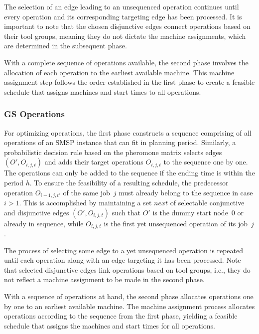 \documentclass[runningheads]{llncs}
\begin{document}
The selection of an edge leading to an unsequenced operation continues until every operation and its corresponding targeting edge has been processed. It is important to note that the chosen disjunctive edges connect operations based on their tool groups, meaning they do not dictate the machine assignments, which are determined in the subsequent phase.

With a complete sequence of operations available, the second phase involves the allocation of each operation to the earliest available machine. This machine assignment step follows the order established in the first phase to create a feasible schedule that assigns machines and start times to all operations.

\subsubsection{GS Operations}
For optimizing operations, the first phase constructs a sequence comprising of all operations
of an SMSP instance that can fit in planning period.
Similarly, a probabilistic decision rule based on the pheromone
matrix selects edges $(O',O_{i,j,t})$
and adds their target operations $O_{i,j,t}$
to the sequence one by one. The operations can only be added to the sequence if the ending time is within the period $h$.
To ensure the feasibility of a resulting schedule,
the predecessor operation $O_{i-1,j,t'}$ of the same job~$j$
must already belong to the sequence in case $i>1$.
This is accomplished by maintaining a set $\mathit{next}$
of selectable conjunctive and disjunctive edges $(O',O_{i,j,t})$
such that $O'$ is the dummy start node~$0$ or already in sequence,
while $O_{i,j,t}$ is the first yet unsequenced operation of its job~$j$.

The process of selecting some edge to a yet unsequenced operation
is repeated until each operation along with an edge targeting it
has been processed.
Note that selected disjunctive edges link operations based on tool groups,
i.e., they do not reflect a machine assignment to be made in the second phase.

With a sequence of operations at hand,
the second phase allocates operations one by one to an earliest
available machine.
The machine assignment process allocates operations
according to the sequence from the first phase, yielding a
feasible schedule that assigns the machines and start times for all operations.
\end{document}
